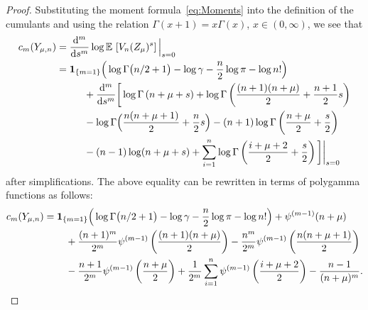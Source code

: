 \documentclass[AHL,Unicode,longabstracts,published]{cedram}
\newcommand{\EE}{\mathbb{E}\,}
\newcommand{\dd}{{\rm d}}
\begin{document}
\begin{proof}
Substituting the moment formula~\eqref{eq:Moments} into the definition of the cumulants and using the relation $\Gamma(x+1)=x\Gamma(x)$, $x\in(0,\infty)$, we see that
\begin{align*}
c_m(Y_{\mu,n})&=\frac{\dd^m}{\dd s^m}\log \EE\left[V_n(Z_{\mu})^{s}\right]\Big|_{s=0}\\
&={\bf 1}_{\{m=1\}}\Big(\log \Gamma\big(n/2+1\big)-\log\gamma-\frac{n}{2}\log\pi-\log n!\Big)\\
&\mkern50mu +\frac{\dd^m}{\dd s^m}\bigg[\log\Gamma\left(n+\mu+s\right)+\log\Gamma\left(\frac{(n+1)(n+\mu)}{2}+\frac{n+1}{2}s\right)\\
&\mkern50mu -\log\Gamma\Big(\frac{n(n+\mu+1)}{2}+\frac{n}{2}s\Big)-(n+1)\log\Gamma\left(\frac{n+\mu}{2}+\frac{s}{2}\right)\\
&\mkern50mu -(n-1)\log(n+\mu+s)+\sum\limits_{i=1}^n\log\Gamma\left(\frac{i+\mu+2}{2}+\frac{s}{2}\right)\bigg]\bigg|_{s=0}
\end{align*}
after simplifications. The above equality can be rewritten in terms of polygamma functions as follows:
\begin{align*}
c_m(Y_{\mu,n})&={\bf 1}_{\{m=1\}}\Big(\log\Gamma\big(n/2+1\big)-\log\gamma-\frac{n}{2}\log\pi-\log n!\Big)+\psi^{(m-1)}(n+\mu)\\
&\mkern40mu +\frac{(n+1)^m}{2^m}\psi^{(m-1)}\left(\frac{(n+1)(n+\mu)}{2}\right)-\frac{n^m}{2^m}\psi^{(m-1)}\left(\frac{n(n+\mu+1)}{2}\right)\\
&\mkern40mu -\frac{n+1}{2^m}\psi^{(m-1)}\left(\frac{n+\mu}{2}\right)+\frac{1}{2^m}\sum\limits_{i=1}^n\psi^{(m-1)}\left(\frac{i+\mu+2}{2}\right)-\frac{n-1}{(n+\mu)^m}.
\end{align*}


\end{proof}
\end{document}
